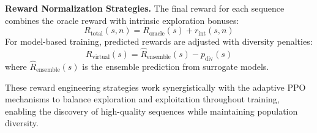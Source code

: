 \textbf{Reward Normalization Strategies.} The final reward for each sequence combines the oracle reward with intrinsic exploration bonuses:
%
\begin{equation}
R_{\text{total}}(s, n) = R_{\text{oracle}}(s) + r_{\text{int}}(s, n)
\end{equation}
%
For model-based training, predicted rewards are adjusted with diversity penalties:
%
\begin{equation}
R_{\text{virtual}}(s) = \hat{R}_{\text{ensemble}}(s) - p_{\text{div}}(s)
\end{equation}
%
where $\hat{R}_{\text{ensemble}}(s)$ is the ensemble prediction from surrogate models.

These reward engineering strategies work synergistically with the adaptive PPO mechanisms to balance exploration and exploitation throughout training, enabling the discovery of high-quality sequences while maintaining population diversity.
